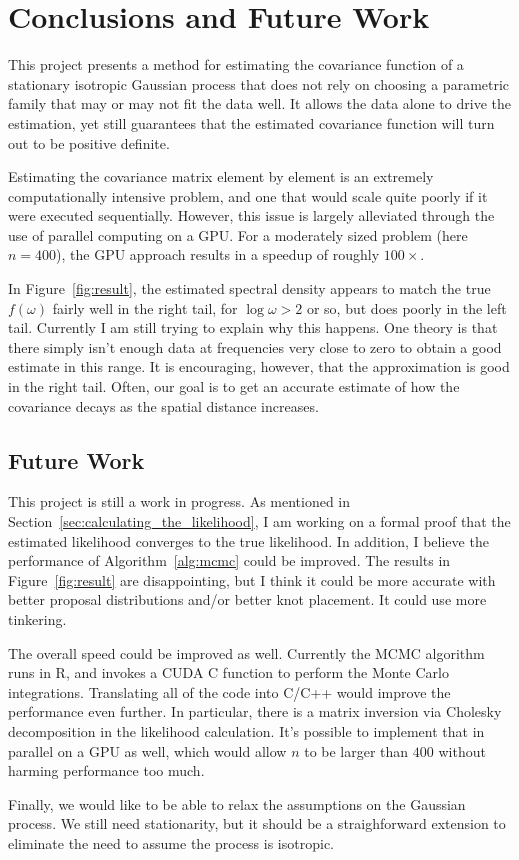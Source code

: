 \chapter{Conclusions and Future Work} \label{chapter5:Conclusions}

This project presents a method for estimating the covariance function of a stationary isotropic Gaussian process that does not rely on choosing a parametric family that may or may not fit the data well. It allows the data alone to drive the estimation, yet still guarantees that the estimated covariance function will turn out to be positive definite.

Estimating the covariance matrix element by element is an extremely computationally intensive problem, and one that would scale quite poorly if it were executed sequentially. However, this issue is largely alleviated through the use of parallel computing on a GPU. For a moderately sized problem (here $n = 400$), the GPU approach results in a speedup of roughly $100\times$.

In Figure~\ref{fig:result}, the estimated spectral density appears to match the true $f(\omega)$ fairly well in the right tail, for $\log \omega > 2$ or so, but does poorly in the left tail. Currently I am still trying to explain why this happens. One theory is that there simply isn't enough data at frequencies very close to zero to obtain a good estimate in this range. It is encouraging, however, that the approximation is good in the right tail. Often, our goal is to get an accurate estimate of how the covariance decays as the spatial distance increases.

\section{Future Work} %
\label{sec:future_work}

This project is still a work in progress. As mentioned in Section~\ref{sec:calculating_the_likelihood}, I am working on a formal proof that the estimated likelihood converges to the true likelihood. In addition, I believe the performance of Algorithm~\ref{alg:mcmc} could be improved. The results in Figure~\ref{fig:result} are disappointing, but I think it could be more accurate with better proposal distributions and/or better knot placement. It could use more tinkering.

The overall speed could be improved as well. Currently the MCMC algorithm runs in R, and invokes a CUDA C function to perform the Monte Carlo integrations. Translating all of the code into C/C++ would improve the performance even further. In particular, there is a matrix inversion via Cholesky decomposition in the likelihood calculation. It's possible to implement that in parallel on a GPU as well, which would allow $n$ to be larger than $400$ without harming performance too much.

Finally, we would like to be able to relax the assumptions on the Gaussian process. We still need stationarity, but it should be a straighforward extension to eliminate the need to assume the process is isotropic.

